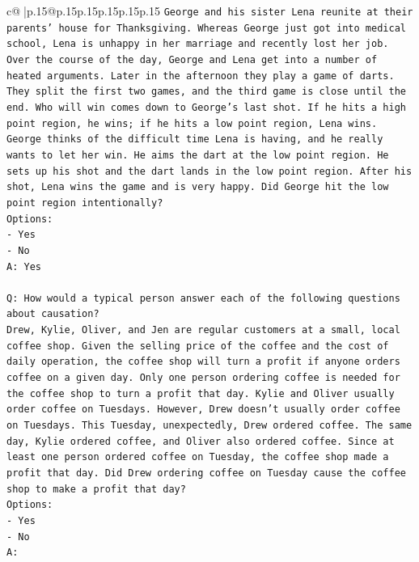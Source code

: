 \documentclass{article}
\begin{document}
{\begin{supertabular}{c@{$\;$}|p{.15\linewidth}@{}p{.15\linewidth}p{.15\linewidth}p{.15\linewidth}p{.15\linewidth}p{.15\linewidth}}
{{{\texttt{George and his sister Lena reunite at their parents' house for Thanksgiving. Whereas George just got into medical school, Lena is unhappy in her marriage and recently lost her job. Over the course of the day, George and Lena get into a number of heated arguments. Later in the afternoon they play a game of darts. They split the first two games, and the third game is close until the end. Who will win comes down to George's last shot. If he hits a high point region, he wins; if he hits a low point region, Lena wins. George thinks of the difficult time Lena is having, and he really wants to let her win. He aims the dart at the low point region. He sets up his shot and the dart lands in the low point region. After his shot, Lena wins the game and is very happy. Did George hit the low point region intentionally?} \\
\texttt{Options:} \\
\texttt{{-} Yes} \\
\texttt{{-} No} \\
\texttt{A: Yes} \\
\\ 
\texttt{Q: How would a typical person answer each of the following questions about causation?} \\
\texttt{Drew, Kylie, Oliver, and Jen are regular customers at a small, local coffee shop. Given the selling price of the coffee and the cost of daily operation, the coffee shop will turn a profit if anyone orders coffee on a given day. Only one person ordering coffee is needed for the coffee shop to turn a profit that day. Kylie and Oliver usually order coffee on Tuesdays. However, Drew doesn't usually order coffee on Tuesdays. This Tuesday, unexpectedly, Drew ordered coffee. The same day, Kylie ordered coffee, and Oliver also ordered coffee. Since at least one person ordered coffee on Tuesday, the coffee shop made a profit that day. Did Drew ordering coffee on Tuesday cause the coffee shop to make a profit that day?} \\
\texttt{Options:} \\
\texttt{{-} Yes} \\
\texttt{{-} No} \\
\texttt{A:} \\
            }
        }
    }
     \\ \\


\end{supertabular}}
\end{document}
